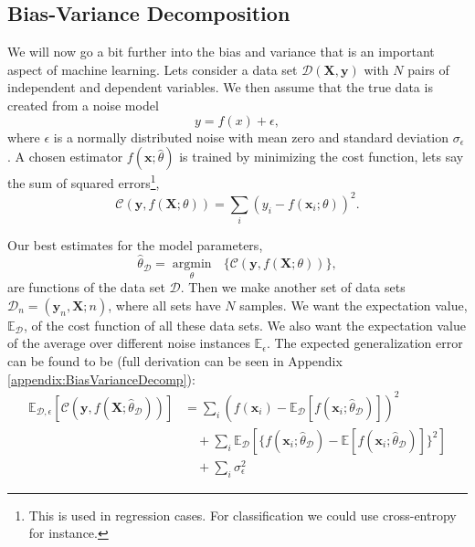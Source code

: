 \documentclass[a4paper, american, 12pt]{report}
\DeclareMathOperator*{\argmin}{argmin}
\begin{document}
	
	\subsection{Bias-Variance Decomposition}
	\label{subsect:Theory-BiasVarianceDecomp}
	We will now go a bit further into the bias and variance that is an important aspect of machine learning. Lets consider a data set $\mathcal{D}(\textbf{X},\textbf{y})$ with $N$ pairs of independent and dependent variables. We then assume that the true data is created from a noise model 
	\begin{equation}
		y=f(x)+\epsilon,
	\end{equation}
	where $\epsilon$ is a normally distributed noise with mean zero and standard deviation $\sigma_{\epsilon}$. A chosen estimator $f(\textbf{x};\hat{\theta})$ is trained by minimizing the cost function, lets say the sum of squared errors\footnote{This is used in regression cases. For classification we could use cross-entropy for instance.}, 
	\begin{equation}
		\mathcal{C}(\textbf{y}, f(\textbf{X};\theta))=\sum_{i}(y_i-f(\textbf{x}_i;\theta))^2.
	\end{equation}
	
	Our best estimates for the model parameters,
	\begin{equation}
		\hat{\theta}_{\mathcal{D}}=\underset{\theta}{\argmin}\text{ } \{\mathcal{C}(\textbf{y},f(\textbf{X};\theta))\},
	\end{equation}
	are functions of the data set $\mathcal{D}$. Then we make another set of data sets $\mathcal{D}_n=(\textbf{y}_n,\textbf{X};n)$, where all sets have $N$ samples. We want the expectation value, $\mathds{E}_{\mathcal{D}}$, of the cost function of all these data sets. We also want the expectation value of the average over different noise instances $\mathds{E}_{\epsilon}$. The expected generalization error can be found to be (full derivation can be seen in Appendix \ref{appendix:BiasVarianceDecomp}):
	\begin{align}
	\label{eq:ExpctGenError}
		\mathds{E}_{\mathcal{D},\epsilon}[\mathcal{C}(\textbf{y}, f(\textbf{X};\hat{\theta}_{\mathcal{D}}))]&= \sum_i(f(\textbf{x}_i)-\mathds{E}_{\mathcal{D}}[f(\textbf{x}_i;\hat{\theta}_{\mathcal{D}})])^2 \nonumber\\
		& \quad +\sum_i \mathds{E}_{\mathcal{D}}[\{f(\textbf{x}_i;\hat{\theta}_{\mathcal{D}})-\mathds{E}[f(\textbf{x}_i;\hat{\theta}_{\mathcal{D}})]\}^2] 
		\nonumber\\
		& \quad + \sum_{i}\sigma_{\epsilon}^2
	\end{align}
	
\end{document}
